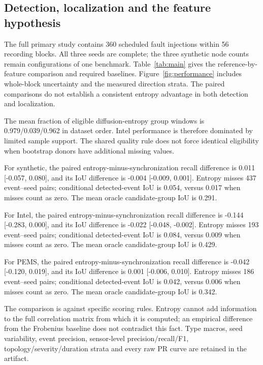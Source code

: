 

\subsection{Detection, localization and the feature hypothesis}

The full primary study contains 360 scheduled fault injections within 56 recording blocks. All three seeds are complete; the three synthetic node counts remain configurations of one benchmark. Table~\ref{tab:main} gives the reference-by-feature comparison and required baselines. Figure~\ref{fig:performance} includes whole-block uncertainty and the measured direction strata. The paired comparisons do not establish a consistent entropy advantage in both detection and localization.

The mean fraction of eligible diffusion-entropy group windows is 0.979/0.039/0.962 in dataset order. Intel performance is therefore dominated by limited sample support. The shared quality rule does not force identical eligibility when bootstrap donors have additional missing values.

For synthetic, the paired entropy-minus-synchronization recall difference is 0.011 [-0.057, 0.080], and its IoU difference is -0.004 [-0.009, 0.001]. Entropy misses 437 event--seed pairs; conditional detected-event IoU is 0.054, versus 0.017 when misses count as zero. The mean oracle candidate-group IoU is 0.291.

For Intel, the paired entropy-minus-synchronization recall difference is -0.144 [-0.283, 0.000], and its IoU difference is -0.022 [-0.048, -0.002]. Entropy misses 193 event--seed pairs; conditional detected-event IoU is 0.084, versus 0.009 when misses count as zero. The mean oracle candidate-group IoU is 0.429.

For PEMS, the paired entropy-minus-synchronization recall difference is -0.042 [-0.120, 0.019], and its IoU difference is 0.001 [-0.006, 0.010]. Entropy misses 186 event--seed pairs; conditional detected-event IoU is 0.042, versus 0.006 when misses count as zero. The mean oracle candidate-group IoU is 0.342.

The comparison is against specific scoring rules. Entropy cannot add information to the full correlation matrix from which it is computed; an empirical difference from the Frobenius baseline does not contradict this fact. Type macros, seed variability, event precision, sensor-level precision/recall/F1, topology/severity/duration strata and every raw PR curve are retained in the artifact.

